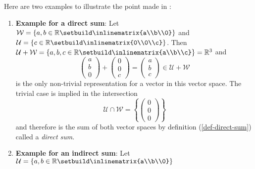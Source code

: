 \begin{exm}
	Here are two examples to illustrate the point made in :
	\begin{enumerate}
		\item \textbf{Example for a direct sum}:
		      Let
		      $\mathcal{W}=\left\{a,b\in\mathbb{R}\setbuild\inlinematrix{a\\b\\0}\right\}$
		      and
		      $\mathcal{U}=\left\{c\in\mathbb{R}\setbuild\inlinematrix{0\\0\\c}\right\}$.
		      Then
		      $\mathcal{U}+\mathcal{W}=\left\{a,b,c\in\mathbb{R}\setbuild\inlinematrix{a\\b\\c}\right\}=\mathbb{R}^3$
		      and
		      \begin{equation*}
			      \begin{pmatrix}
				      a \\b\\0
			      \end{pmatrix}+
			      \begin{pmatrix}
				      0 \\0\\c
			      \end{pmatrix}=
			      \begin{pmatrix}
				      a \\b\\c
			      \end{pmatrix}\in\mathcal{U}+\mathcal{W}
		      \end{equation*}
		      is the only non-trivial representation for a vector in this vector space.
		      The trivial case is implied in the intersection
		      \begin{equation*}
			      \mathcal{U}\cap\mathcal{W}=\left\{\begin{pmatrix}
				      0 \\0\\0
			      \end{pmatrix}\right\}
		      \end{equation*}
		      and therefore is the sum of both vector spaces by
		      definition (\ref{def-direct-sum}) called a \textit{direct sum}.
		\item \textbf{Example for an indirect sum}:
		      Let
		      $\mathcal{U}=\left\{a,b\in\mathbb{R}\setbuild\inlinematrix{a\\b\\0}\right\}$

\end{enumerate}
\end{exm}
